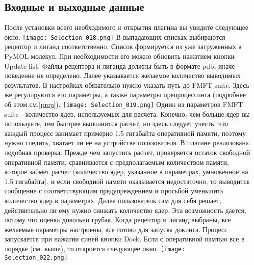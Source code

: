 \documentclass[a4paper,12pt]{article}
\numberwithin{equation}{section}%
\begin{document}
\subsection{Входные и выходные данные}
После установки всего необходимого и открытия плагина вы увидите следующее окно.
\newline
\newline
\texttt{[image: Selection\_018.png]}
\newline
\newline
В выпадающих списках выбираются рецептор и лиганд соответственно. Список формируется из уже загруженных в PyMOL молекул. При необходимости его можно обновить нажатием кнопки Update list. Файлы рецептора и лиганда должны быть в формате pdb, иначе поведение не определено.
\newline
Далее указывается желаемое количество выводимых результатов.
\newline
В настройках обязательно нужно указать путь до FMFT suite. Здесь же регулируются его параметры, а также параметры препроцессинга (подробнее об этом см.\ref{prep}). 
\newline
\newline
\texttt{[image: Selection\_019.png]}
\newline
\newline
Однин из параметров FMFT suite - количество ядер, используемых для расчета. Конечно, чем больше ядер вы используете, тем быстрее выполнится расчет, но здесь следует учесть, что каждый процесс занимает примерно 1.5 гигабайта оперативной памяти, поэтому нужно следить, хватает ли ее на устройстве пользователя. В плагине реализована подобная проверка. Прежде чем запустить расчет, проверяется остаток свободной оперативной памяти, сравнивается с предполагаемым количеством памяти, которое займет расчет (количество ядер, указанное в параметрах, умноженное на 1.5 гигабайта), и если свободной памяти оказывается недостаточно, то выводится сообщение с соответствующим предупреждением и просьбой уменьшить количество ядер в параметрах. Далее пользователь сам для себя решает, действительно ли ему нужно снижать количество ядер. Эта возможность дается, потому что оценка довольно грубая.
\newline
Когда рецептор и лиганд выбраны, все желаемые параметры настроены, все готово для запуска докинга. Процесс запускается при нажатии синей кнопки Dock. Если с оперативной памтью все в порядке (см. выше), то откроется следующее окно.
\newline
\texttt{[image: Selection\_022.png]}
\end{document}
